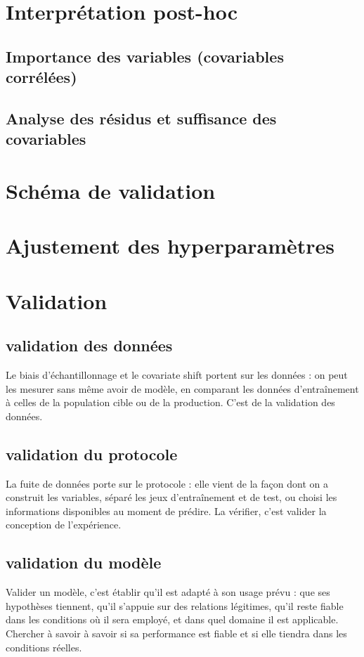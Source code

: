 	\section{Interprétation post-hoc}
		\subsection{Importance des variables (covariables corrélées)}
		\subsection{Analyse des résidus et suffisance des covariables}
	



















	\section{Schéma de validation}
	\section{Ajustement des hyperparamètres}
	\section{Validation}
	\subsection{validation des données}
	Le biais d'échantillonnage et le covariate shift portent sur les données : on peut les mesurer sans même avoir de modèle, en comparant les données d'entraînement à celles de la population cible ou de la production. C'est de la validation des données.
	\subsection{validation du protocole}
	La fuite de données porte sur le protocole : elle vient de la façon dont on a construit les variables, séparé les jeux d'entraînement et de test, ou choisi les informations disponibles au moment de prédire. La vérifier, c'est valider la conception de l'expérience.
	\subsection{validation du modèle}
	Valider un modèle, c'est établir qu'il est adapté à son usage prévu : que ses hypothèses tiennent, qu'il s'appuie sur des relations légitimes, qu'il reste fiable dans les conditions où il sera employé, et dans quel domaine il est applicable. Chercher à savoir à savoir si sa performance est fiable et si elle tiendra dans les conditions réelles.
	
